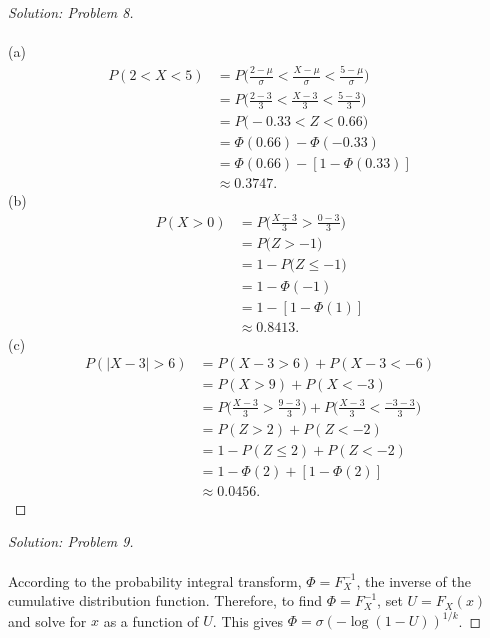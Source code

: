 \documentclass[10pt]{article}
\begin{document}
\vspace{0.2cm}
\begin{proof}[Solution: Problem 8]
\text{}\\
\text{}\\
(a)
\begin{align*}
P(2 < X < 5) &= P\bigg(\frac{2 - \mu}{\sigma} < \frac{X - \mu}{\sigma} < \frac{5  - \mu}{\sigma}\bigg)\\
&= P\bigg(\frac{2 - 3}{3} < \frac{X - 3}{3} < \frac{5  - 3}{3}\bigg)\\
&= P\bigg(-0.33 < Z < 0.66 \bigg)\\
&= \Phi(0.66) -  \Phi(-0.33)\\
&= \Phi(0.66) -  [1 - \Phi(0.33)]\\
&\approx 0.3747.
\end{align*}
(b)
\begin{align*}
P(X > 0) &= P\bigg(\frac{X - 3}{3} > \frac{0  - 3}{3}\bigg)\\
&= P\bigg(Z > -1 \bigg)\\
&= 1 - P\bigg(Z \leq -1 \bigg)\\
&= 1 - \Phi(-1)\\
&= 1 - [1 - \Phi(1)]\\
&\approx 0.8413.
\end{align*}
(c)
\begin{align*}
P(|X - 3| > 6) &= P(X - 3 > 6)  + P(X - 3 < -6) \\
&= P(X  > 9)  + P(X < -3) \\
&= P\bigg(\frac{X-3}{3}  > \frac{9-3}{3}\bigg)  + P(\frac{X-3}{3} < \frac{-3-3}{3}\bigg)\\
&= P(Z  > 2)  + P(Z < -2)\\
&= 1 - P(Z  \leq 2)  + P(Z < -2)\\
&= 1 - \Phi(2)  + [1-\Phi(2)]\\
&\approx 0.0456.
\end{align*}
\end{proof}

\begin{proof}[Solution: Problem 9]
\text{}\\
\text{}\\
According to the probability integral transform, $\Phi = F_X^{-1}$, the inverse of the cumulative distribution function. Therefore, to find $\Phi = F_X^{-1}$, set $U = F_X(x)$ and solve for $x$ as a function of $U$. This gives $\Phi  = \sigma(-\log(1-U))^{1/k}$.
\end{proof}
\end{document}
